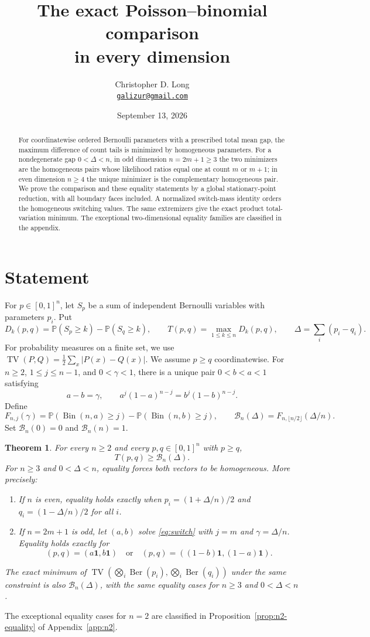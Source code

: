 \documentclass[11pt]{article}
\title{The exact Poisson--binomial comparison\\in every dimension}
\author{Christopher D. Long\\
  \small\href{mailto:galizur@gmail.com}{\texttt{galizur@gmail.com}}}
\date{September 13, 2026}
\numberwithin{equation}{section}
\newtheorem{theorem}{Theorem}[section]
\theoremstyle{remark}\newtheorem{remark}[theorem]{Remark}
\DeclareMathOperator{\Ber}{Ber}
\DeclareMathOperator{\Bin}{Bin}
\DeclareMathOperator{\TV}{TV}
\newcommand{\PP}{\mathbb P}
\newcommand{\one}{\mathbf 1}
\newcommand{\Bcal}{\mathcal B}
\begin{document}
\maketitle
\begin{abstract}
For coordinatewise ordered Bernoulli parameters with a prescribed total
mean gap, the maximum difference of count tails is minimized by homogeneous
parameters. For a nondegenerate gap $0<\Delta<n$, in odd dimension
$n=2m+1\ge3$ the two minimizers are the homogeneous pairs whose likelihood
ratios equal one at count $m$ or $m+1$; in even dimension $n\ge4$ the
unique minimizer is the complementary homogeneous pair. We prove the comparison and these equality statements by a global
stationary-point reduction, with all boundary faces included. A normalized
switch-mass identity orders the homogeneous switching values. The same
extremizers give the exact product total-variation minimum. The exceptional
two-dimensional equality families are classified in the appendix.
\end{abstract}

\section{Statement}
For $p\in[0,1]^n$, let $S_p$ be a sum of independent Bernoulli variables
with parameters $p_i$. Put
\[
 D_k(p,q)=\PP(S_p\ge k)-\PP(S_q\ge k),\qquad
 T(p,q)=\max_{1\le k\le n}D_k(p,q),\qquad
 \Delta=\sum_i(p_i-q_i).
\]
For probability measures on a finite set, we use
$\TV(P,Q)=\tfrac12\sum_x|P(x)-Q(x)|$.
We assume $p\ge q$ coordinatewise. For $n\ge2$, $1\le j\le n-1$, and
$0<\gamma<1$, there is a unique pair $0<b<a<1$ satisfying
\begin{equation}\label{eq:switch}
 a-b=\gamma,\qquad a^j(1-a)^{n-j}=b^j(1-b)^{n-j}.
\end{equation}
Define
\[
 F_{n,j}(\gamma)=\PP(\Bin(n,a)\ge j)-\PP(\Bin(n,b)\ge j),
 \qquad
 \Bcal_n(\Delta)=F_{n,\lfloor n/2\rfloor}(\Delta/n).
\]
Set $\Bcal_n(0)=0$ and $\Bcal_n(n)=1$.

\begin{theorem}\label{thm:main}
For every $n\ge2$ and every $p,q\in[0,1]^n$ with $p\ge q$,
\begin{equation}\label{eq:main}
 T(p,q)\ge\Bcal_n(\Delta).
\end{equation}
For $n\ge3$ and $0<\Delta<n$, equality forces both vectors to be
homogeneous. More precisely:
\begin{enumerate}
\item If $n$ is even, equality holds exactly when
$p_i=(1+\Delta/n)/2$ and $q_i=(1-\Delta/n)/2$ for all $i$.
\item If $n=2m+1$ is odd, let $(a,b)$ solve \eqref{eq:switch} with
$j=m$ and $\gamma=\Delta/n$. Equality holds exactly for
\[
 (p,q)=(a\one,b\one)
 \quad\text{or}\quad
 (p,q)=((1-b)\one,(1-a)\one).
\]
\end{enumerate}
The exact minimum of
$\TV(\bigotimes_i\Ber(p_i),\bigotimes_i\Ber(q_i))$ under the same
constraint is also $\Bcal_n(\Delta)$, with the same equality cases for
$n\ge3$ and $0<\Delta<n$.
\end{theorem}
The exceptional equality cases for $n=2$ are classified in
Proposition~\ref{prop:n2-equality} of Appendix~\ref{app:n2}.
\end{document}
